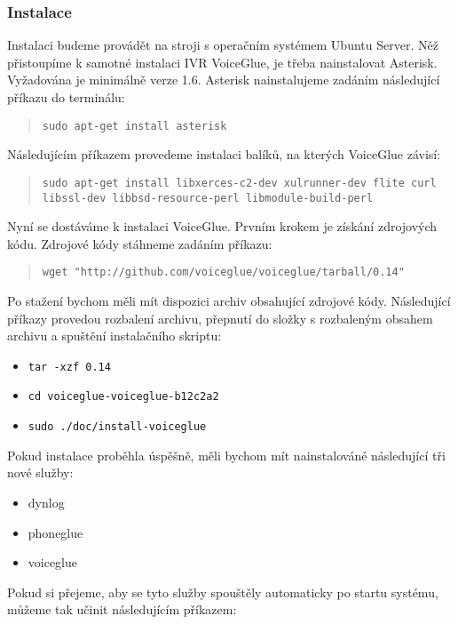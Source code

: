 \documentclass[ing,male,java,dept460,twoside]{diploma}						%
\begin{document}
\subsubsection{Instalace}
Instalaci budeme provádět na stroji s operačním systémem Ubuntu Server. Něž přistoupíme k samotné instalaci IVR VoiceGlue, je třeba nainstalovat Asterisk. Vyžadována je minimálně verze 1.6. Asterisk nainstalujeme zadáním následující příkazu do terminálu:

\begin{quote}
	\texttt{sudo apt-get install asterisk}
\end{quote}

Následujícím příkazem provedeme instalaci balíků, na kterých VoiceGlue závisí:

\begin{quote}
	\texttt{sudo apt-get install libxerces-c2-dev xulrunner-dev flite curl libssl-dev libbsd-resource-perl libmodule-build-perl}
\end{quote}

Nyní se dostáváme k instalaci VoiceGlue. Prvním krokem je získání zdrojových kódu. Zdrojové kódy stáhneme zadáním příkazu:

\begin{quote}
	\texttt{wget "http://github.com/voiceglue/voiceglue/tarball/0.14"}
\end{quote}

Po stažení bychom měli mít dispozici archiv obsahující zdrojové kódy. Následující příkazy provedou rozbalení archivu, přepnutí do složky s rozbaleným obsahem archivu a spuštění instalačního skriptu:

\begin{itemize}
\item \texttt{tar -xzf 0.14}
\item \texttt{cd voiceglue-voiceglue-b12c2a2}
\item \texttt{sudo ./doc/install-voiceglue}
\end{itemize}

Pokud instalace proběhla úspěšně, měli bychom mít nainstalováné následující tři nové služby:

\begin{itemize}
\item dynlog
\item phoneglue
\item voiceglue
\end{itemize}

Pokud si přejeme, aby se tyto služby spouštěly automaticky po startu systému, můžeme tak učinit následujícím příkazem:
\end{document}

